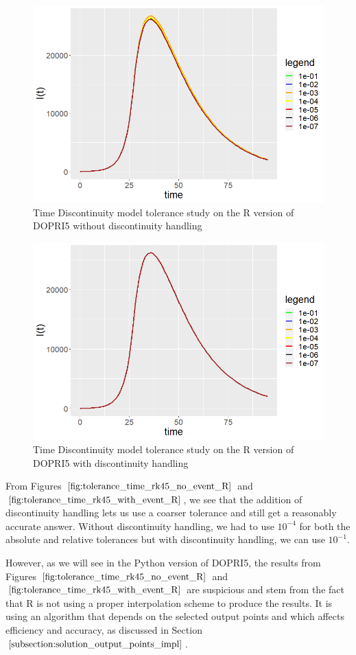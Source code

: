 \begin{figure}[H]
\centering
\includegraphics[width=0.7\linewidth]{./figures/tolerance_time_rk45_no_event_R}
\caption{Time Discontinuity model tolerance study on the R version of DOPRI5 without discontinuity handling}
\label{fig:tolerance_time_rk45_no_event_R}
\end{figure}

\begin{figure}[H]
\centering
\includegraphics[width=0.7\linewidth]{./figures/tolerance_time_rk45_with_event_R}
\caption{Time Discontinuity model tolerance study on the R version of DOPRI5 with discontinuity handling}
\label{fig:tolerance_time_rk45_with_event_R}
\end{figure}

From Figures $\ref{fig:tolerance_time_rk45_no_event_R}$ and $\ref{fig:tolerance_time_rk45_with_event_R}$, we see that the addition of discontinuity handling lets us use a coarser tolerance and still get a reasonably accurate answer. Without discontinuity handling, we had to use $10^{-4}$ for both the absolute and relative tolerances but with discontinuity handling, we can use $10^{-1}$. 

However, as we will see in the Python version of DOPRI5, the results from Figures $\ref{fig:tolerance_time_rk45_no_event_R}$ and $\ref{fig:tolerance_time_rk45_with_event_R}$ are suspicious and stem from the fact that R is not using a proper interpolation scheme to produce the results. It is using an algorithm that depends on the selected output points and which affects efficiency and accuracy, as discussed in Section $\ref{subsection:solution_output_points_impl}$. 

